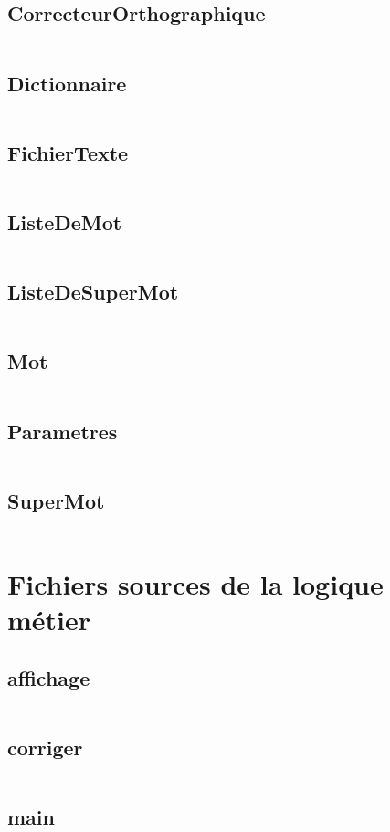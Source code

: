 \documentclass[12pt,titlepage,a4paper]{report}
\newcommand{\inputCodeC}[1]{\inputminted[tabsize=4,linenos]{c}{../programme/src/#1.c}}
\begin{document}
	\section{CorrecteurOrthographique} 		\inputCodeC{TADCorrecteurOrthographique}
	\section{Dictionnaire}					\inputCodeC{TADDictionnaire}
	\section{FichierTexte}					\inputCodeC{TADFichierTexte}
	\section{ListeDeMot}					\inputCodeC{TADListeDeMot}
	\section{ListeDeSuperMot}				\inputCodeC{TADListeDeSuperMot}
	\section{Mot}							\inputCodeC{TADMot}
	\section{Parametres}					\inputCodeC{TADParametres}
	\section{SuperMot}						\inputCodeC{TADSuperMot}

\chapter{Fichiers sources de la logique métier}
\minitoc
	\section{affichage}						\inputCodeC{affichage}
	\section{corriger}						\inputCodeC{corriger}
	\section{main}							\inputCodeC{main}
\end{document}
